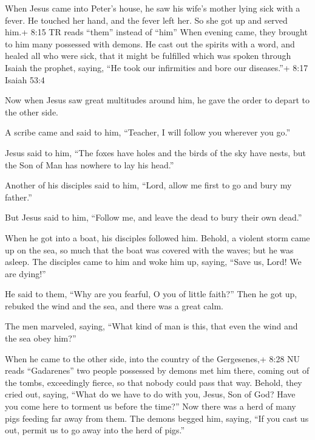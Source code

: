  When Jesus came into Peter's house, he saw his wife's
mother lying sick with a fever.  He touched her hand, and
the fever left her. So she got up and served him.+ 8:15 TR reads
``them'' instead of ``him''  When evening came, they
brought to him many possessed with demons. He cast out the spirits with
a word, and healed all who were sick,  that it might be
fulfilled which was spoken through Isaiah the prophet, saying, ``He took
our infirmities and bore our diseases.''+ 8:17 Isaiah 53:4

 Now when Jesus saw great multitudes around him, he gave
the order to depart to the other side.

 A scribe came and said to him, ``Teacher, I will follow
you wherever you go.''

 Jesus said to him, ``The foxes have holes and the birds of
the sky have nests, but the Son of Man has nowhere to lay his head.''

 Another of his disciples said to him, ``Lord, allow me
first to go and bury my father.''

 But Jesus said to him, ``Follow me, and leave the dead to
bury their own dead.''

 When he got into a boat, his disciples followed him.
 Behold, a violent storm came up on the sea, so much that
the boat was covered with the waves; but he was asleep. 
The disciples came to him and woke him up, saying, ``Save us, Lord! We
are dying!''

 He said to them, ``Why are you fearful, O you of little
faith?'' Then he got up, rebuked the wind and the sea, and there was a
great calm.

 The men marveled, saying, ``What kind of man is this, that
even the wind and the sea obey him?''

 When he came to the other side, into the country of the
Gergesenes,+ 8:28 NU reads ``Gadarenes'' two people possessed by demons
met him there, coming out of the tombs, exceedingly fierce, so that
nobody could pass that way.  Behold, they cried out,
saying, ``What do we have to do with you, Jesus, Son of God? Have you
come here to torment us before the time?''  Now there was a
herd of many pigs feeding far away from them.  The demons
begged him, saying, ``If you cast us out, permit us to go away into the
herd of pigs.''

